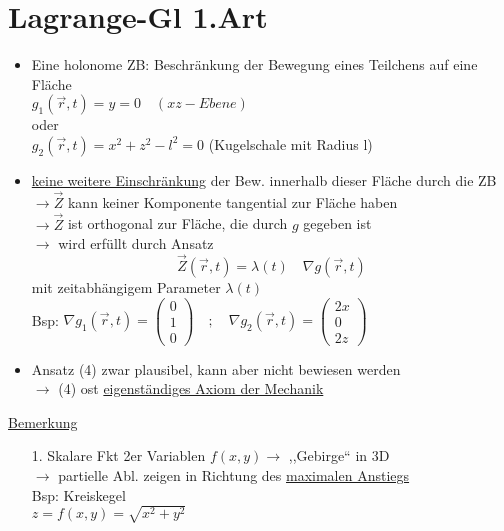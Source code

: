 \documentclass[titlepage,12pt,a4paper,ngerman]{report}
\begin{document}
{\section{Lagrange-Gl 1.Art}
\begin{itemize}
	\item Eine holonome ZB: Beschränkung der Bewegung eines Teilchens auf eine Fläche\\
	$ g_1(\vec{r},t) = y = 0  \quad (xz-Ebene)$\\
	oder\\
	$ g_2(\vec{r},t) = x^2 + z^2 - l^2 = 0 $ (Kugelschale mit Radius l)
	\item \underline{keine weitere Einschränkung} der Bew. innerhalb dieser Fläche durch die ZB\\
	$ \rightarrow \vec{Z} $ kann keiner Komponente tangential zur Fläche haben\\
	$ \rightarrow \vec{Z} $ ist orthogonal zur Fläche, die durch $g$ gegeben ist\\
	$ \rightarrow $ wird erfüllt durch Ansatz\\
	\begin{equation*}
	\vec{Z}(\vec{r},t) = \lambda(t) \quad \nabla g(\vec{r},t) \tag{4}
	\end{equation*}
	mit zeitabhängigem Parameter $ \lambda(t) $\\
	Bsp: $ \nabla g_1(\vec{r},t) = \begin{pmatrix}
	0\\1\\0
	\end{pmatrix} \quad ; \quad \nabla g_2(\vec{r},t) = \begin{pmatrix}
	2x\\0\\2z
	\end{pmatrix} $
	\item Ansatz (4) zwar plausibel, kann aber nicht bewiesen werden\\
	$ \rightarrow $ (4) ost \underline{eigenständiges Axiom der Mechanik}
\end{itemize}
\underline{Bemerkung}\\
\begin{itemize}
	\item[1.] Skalare Fkt 2er Variablen $ f(x,y)  \rightarrow  $ ,,Gebirge`` in 3D\\
	$ \rightarrow $ partielle Abl. zeigen in Richtung des \underline{maximalen Anstiegs}\\
	Bsp: Kreiskegel\\
	$ z = f(x,y) = \sqrt{x^2+y^2} $\\

\end{itemize}}
\end{document}
